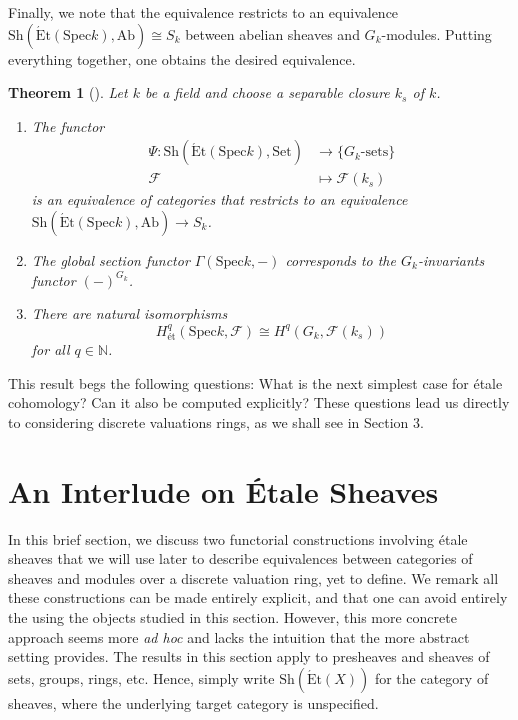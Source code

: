 \documentclass{article}
\newcommand{\Spec}{\mathrm{Spec}}
\newcommand{\Ab}{\mathrm{Ab}}
\newcommand{\Set}{\mathrm{Set}}
\newcommand{\Et}{\acute{\mathrm{E}}\mathrm{t}}
\newcommand{\Sh}{\mathrm{Sh}}
\newcommand{\NN}{\mathbb{N}}
\theoremstyle{plain}
\newtheorem{theorem}{Theorem}[section]
\theoremstyle{definition}
\begin{document}
    Finally, we note that the equivalence restricts to an equivalence $\Sh(\Et(\Spec k),\Ab)\cong S_k$ between abelian sheaves and $G_k$-modules. Putting everything together, one obtains the desired equivalence. 


    \begin{theorem}[{\cite[Theorem 6.4.6]{Poonen}}]\label{thm:etalespeck}
        Let $k$ be a field and choose a separable closure $k_s$ of $k$. 
        \begin{enumerate}
        \item The functor
        \begin{align*}
            \Psi:\Sh(\Et(\Spec k),\Set) & \longrightarrow \{G_k\text{-sets}\} \\ \mathcal{F} & \longmapsto \mathcal{F}(k_s) 
        \end{align*}
        is an equivalence of categories that restricts to an equivalence $\Sh(\Et(\Spec k),\Ab)\rightarrow S_k$.
        \item The global section functor $\Gamma(\Spec k,-)$ corresponds to the $G_k$-invariants functor $(-)^{G_k}$. 
        \item There are natural isomorphisms 
        \[ H^q_{\text{\'et}}(\Spec k, \mathcal{F}) \cong H^q(G_k, \mathcal{F}(k_s)) \] 
        for all $q \in \NN$. 
        \end{enumerate}
    \end{theorem}

    This result begs the following questions: What is the next simplest case for \'{e}tale cohomology? Can it also be computed explicitly? These questions lead us directly to considering discrete valuations rings, as we shall see in Section 3. 
    
    \section{An Interlude on \'{E}tale Sheaves}
    In this brief section, we discuss two functorial constructions involving \'{e}tale sheaves that we will use later to describe equivalences between categories of sheaves and modules over a discrete valuation ring, yet to define. We remark all these constructions can be made entirely explicit, and that one can avoid entirely the using the objects studied in this section. However, this more concrete approach seems more \textit{ad hoc} and lacks the intuition that the more abstract setting provides. The results in this section apply to presheaves and sheaves of sets, groups, rings, etc. Hence, simply write $\Sh(\Et(X))$ for the category of sheaves, where the underlying target category is unspecified. 
\end{document}
